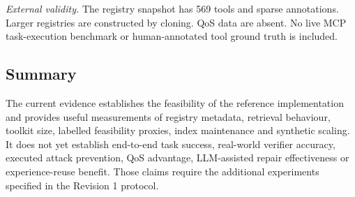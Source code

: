 \emph{External validity.} The registry snapshot has 569 tools and sparse annotations. Larger registries are
constructed by cloning. QoS data are absent. No live MCP task-execution benchmark or human-annotated tool
ground truth is included.

\subsection{Summary}

The current evidence establishes the feasibility of the reference implementation and provides useful measurements
of registry metadata, retrieval behaviour, toolkit size, labelled feasibility proxies, index maintenance and
synthetic scaling. It does not yet establish end-to-end task success, real-world verifier accuracy, executed
attack prevention, QoS advantage, LLM-assisted repair effectiveness or experience-reuse benefit. Those claims
require the additional experiments specified in the Revision 1 protocol.